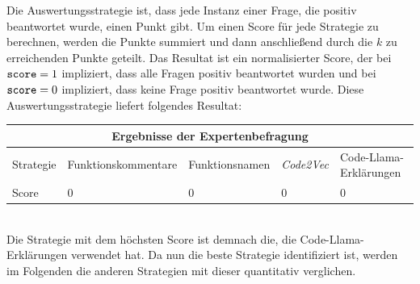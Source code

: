 \documentclass[12pt,letterpaper,ngerman]{article}
\begin{document}
Die Auswertungsstrategie ist, dass jede Instanz einer Frage, die positiv
beantwortet wurde, einen Punkt gibt. Um einen Score für jede Strategie
zu berechnen, werden die Punkte summiert und dann anschließend durch die
$k$ zu erreichenden Punkte geteilt. Das Resultat ist ein normalisierter 
Score, der bei $\verb|score| = 1$ impliziert, dass alle Fragen positiv 
beantwortet wurden und bei $\verb|score| = 0$ impliziert, dass keine 
Frage positiv beantwortet wurde. Diese Auswertungsstrategie liefert 
folgendes Resultat:
\begin{center}
  \begin{tabular}{ |p{1.3cm}||p{3.8cm}|p{3cm}|p{1.8cm}|p{4.5cm}|  }
  \hline
  \multicolumn{5}{|c|}{Ergebnisse der Expertenbefragung} \\
  \hline
  Strategie & Funktionskommentare &  Funktionsnamen & \textit{Code2Vec} & Code-Llama-Erklärungen\\
  \hline
  Score   &  0                    &        0        &   0               & 0\\
  \hline
  \end{tabular}
\end{center} 
\hfill\\
Die Strategie mit dem höchsten Score ist demnach die, die Code-Llama-Erklärungen
verwendet hat. Da nun die beste Strategie identifiziert ist, 
werden im Folgenden die anderen Strategien mit dieser quantitativ verglichen.
\end{document}
